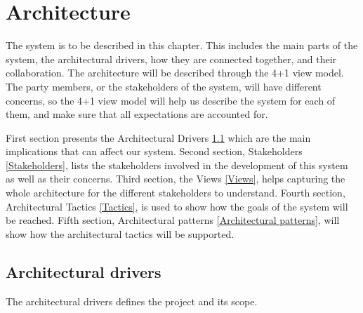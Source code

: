 \chapter{Architecture}

\minitoc

The system is to be described in this chapter. This includes the main parts of the system, the architectural drivers, how they are connected together, and their collaboration. The architecture will be described through the 4+1 view model. The party members, or the stakeholders of the system, will have different concerns, so the 4+1 view model will help us describe the system for each of them, and make sure that all expectations are accounted for.  

First section presents the Architectural Drivers \ref{Architectural drivers} which are the main implications that can affect our system. Second section, Stakeholders \ref{Stakeholders}, lists the stakeholders involved in the development of this system as well as their concerns. Third section, the Views \ref{Views}, helps capturing the whole architecture for the different stakeholders to understand. Fourth section, Architectural Tactics \ref{Tactics}, is used to show how the goals of the system will be reached. Fifth section, Architectural patterns \ref{Architectural patterns}, will show how the architectural tactics will be supported.

\clearpage


\section{Architectural drivers} \label{Architectural drivers}
The architectural drivers defines the project and its scope. 

